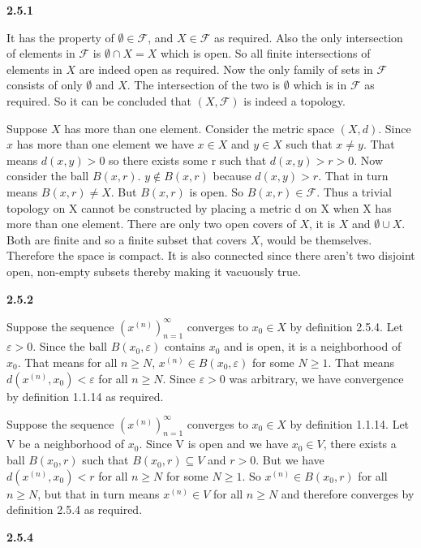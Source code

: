 \documentclass[12pt]{article}
\begin{document}
\textbf{2.5.1}

It has the property of $\emptyset \in \mathcal{F}$, and $X\in \mathcal{F}$ as required. Also the only intersection of elements in $\mathcal{F}$ is $\emptyset \cap X = X$ which is open. So all finite intersections of elements in $X$ are indeed open as required. Now the only family of sets in $\mathcal{F}$ consists of only $\emptyset$ and $X$. The intersection of the two is $\emptyset$ which is in $\mathcal{F}$ as required. So it can be concluded that $(X,\mathcal{F})$ is indeed a topology.

Suppose $X$ has more than one element. Consider the metric space $(X,d)$. Since $x$ has more than one element we have $x\in X$ and $y\in X$ such that $x\neq y$. That means $d(x,y) >0$ so there exists some r such that $d(x,y) >r>0$. Now consider the ball $B(x,r)$. $y\notin B(x,r)$ because $ d(x,y) >r$. That in turn means $B(x,r) \neq X$. But $B(x,r)$ is open. So $B(x,r) \in \mathcal{F}$. Thus a trivial topology on X cannot be constructed by placing a metric d on X when X has more than one element. There are only two open covers of $X$, it is $X$ and $\emptyset\cup X$. Both are finite and so a finite subset that covers $X$, would be themselves. Therefore the space is compact. It is also connected since there aren't two disjoint open, non-empty subsets thereby making it vacuously true.

\textbf{2.5.2}

Suppose the sequence $(x^{(n)})_{n=1}^\infty$ converges to $x_0\in X$ by definition 2.5.4. Let $\varepsilon>0$. Since the ball $B(x_0,\varepsilon)$ contains $x_0$ and is open, it is a neighborhood of $x_0$. That means for all $n\geq N$, $x^{(n)}\in B(x_0,\varepsilon)$ for some $N\geq 1$. That means $ d(x^{(n)},x_0) <\varepsilon$ for all $n\geq N$. Since $\varepsilon>0$ was arbitrary, we have convergence by definition 1.1.14 as required.

Suppose the sequence $(x^{(n)})_{n=1}^\infty$ converges to $x_0\in X$ by definition 1.1.14. Let V be a neighborhood of $x_0$. Since V is open and we have $x_0\in V$, there exists a ball $B(x_0,r)$ such that $B(x_0,r) \subseteq V$ and $r>0$. But we have $d(x^{(n)},x_0)< r$ for all $ n\geq N$ for some $N\geq 1$. So $x^{(n)}\in B(x_0,r)$ for all $n\geq N$, but that in turn means $x^{(n)}\in V$ for all $n\geq N$ and therefore converges by definition 2.5.4 as required.

\textbf{2.5.4}
\end{document}
